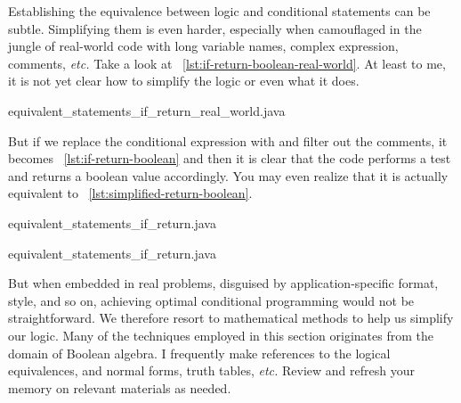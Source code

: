 Establishing the equivalence between logic and conditional statements can be subtle.
Simplifying them is even harder, especially when camouflaged in the
jungle of real-world code with long variable names, complex expression, comments, \textit{etc.}
Take a look at ~\autoref{lst:if-return-boolean-real-world}.
At least to me, it is not yet clear how to simplify the logic or even what it does.
\begin{clisting}
    
    {equivalent_statements_if_return_real_world.java}
\end{clisting}
But if we replace the conditional expression with  and filter out the
comments, it becomes ~\autoref{lst:if-return-boolean} and then
it is clear that the code performs a test and returns a boolean value accordingly.
You may even realize that it is actually equivalent to ~\autoref{lst:simplified-return-boolean}.
\begin{clisting}
    \begin{minipage}[t]{.45\textwidth}
        
        {equivalent_statements_if_return.java}
    \end{minipage}
    \hfill
    \begin{minipage}[t]{.45\textwidth}
        
        {equivalent_statements_if_return.java}
    \end{minipage}
\end{clisting}
But when embedded in real problems, disguised by application-specific format, style, and so on,
achieving optimal conditional programming would not be straightforward.
%        
%        
We therefore resort to mathematical methods to help us simplify our logic.
Many of the techniques employed in this section originates from the domain of Boolean algebra.
I frequently make references to the logical equivalences, and normal forms, truth tables,
\textit{etc.}
Review and refresh your memory on relevant materials as needed.

